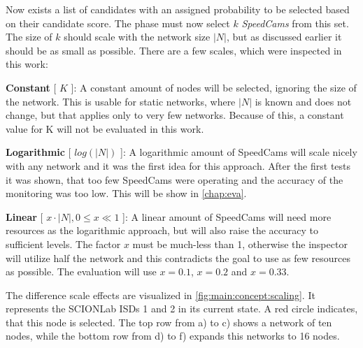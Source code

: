 \documentclass[thesis.tex]{subfiles}
\begin{document}
Now exists a list of candidates with an assigned probability to be selected based on their candidate score. The phase must now select $k$ \textit{SpeedCams} from this set. The size of $k$ should scale with the network size $|N|$, but as discussed earlier it should be as small as possible. There are a few scales, which were inspected in this work:

\textbf{Constant} [ $K$ ]: A constant amount of nodes will be selected, ignoring the size of the network. This is usable for static networks, where $|N|$ is known and does not change, but that applies only to very few networks. Because of this, a constant value for K will not be evaluated in this work.

\textbf{Logarithmic} [ $log(|N|)$ ]: A logarithmic amount of SpeedCams will scale nicely with any network and it was the first idea for this approach. After the first tests it was shown, that too few SpeedCams were operating and the accuracy of the monitoring was too low. This will be show in \autoref{chap:eva}.

\textbf{Linear} [ $x\cdot |N|, 0 \leq x\ll1$ ]: A linear amount of SpeedCams will need more resources as the logarithmic approach, but will also raise the accuracy to sufficient levels. The factor $x$ must be much-less than 1, otherwise the inspector will utilize half the network and this contradicts the goal to use as few resources as possible. The evaluation will use $x=0.1$, $x=0.2$ and $x=0.33$.

The difference scale effects are visualized in \autoref{fig:main:concept:scaling}. It represents the SCIONLab ISDs 1 and 2 in its current state. A red circle indicates, that this node is selected. The top row from a) to c) shows a network of ten nodes, while the bottom row from d) to f) expands this networks to 16 nodes. 
\end{document}
